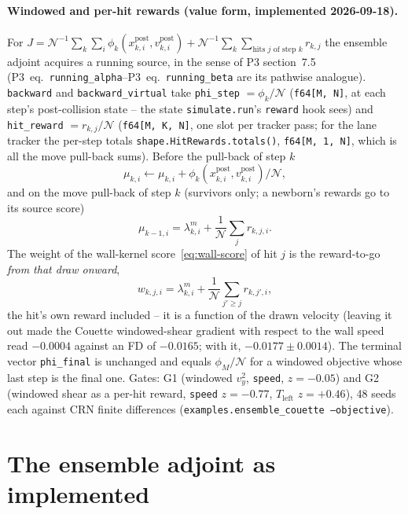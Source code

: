 \documentclass[11pt,a4paper]{article}
\numberwithin{equation}{section}
\newcommand{\code}[1]{\texttt{#1}}
\newcommand{\pth}{\mathrm{post}}
\newcommand{\Nn}{\mathcal{N}}
\newcommand{\pref}[1]{P3~eq.~\code{#1}}
\begin{document}
\paragraph{Windowed and per-hit rewards (value form, implemented 2026-09-18).}
For $J = \Nn^{-1}\sum_{k} \sum_i \phi_k(x^{\pth}_{k,i}, v^{\pth}_{k,i})
 + \Nn^{-1}\sum_k \sum_{\text{hits } j \text{ of step } k} r_{k,j}$
the ensemble adjoint acquires a running source, in the sense of P3 section~7.5
(\pref{running\_alpha}--\pref{running\_beta} are its pathwise analogue).
\code{backward} and \code{backward\_virtual} take \code{phi\_step} $=\phi_k/\Nn$
(\code{f64[M, N]}, at each step's post-collision state -- the state
\code{simulate.run}'s \code{reward} hook sees) and \code{hit\_reward} $=r_{k,j}/\Nn$
(\code{f64[M, K, N]}, one slot per tracker pass; for the lane tracker the per-step
totals \code{shape.HitRewards.totals()}, \code{f64[M, 1, N]}, which is all the move
pull-back sums).  Before the pull-back of step $k$
\begin{equation}
\label{eq:running-source}
\mu_{k,i} \leftarrow \mu_{k,i} + \phi_k(x^{\pth}_{k,i}, v^{\pth}_{k,i})/\Nn ,
\end{equation}
and on the move pull-back of step $k$ (survivors only; a newborn's rewards go to its
source score)
\begin{equation}
\label{eq:hit-source}
\mu_{k-1,i} = \lambda^m_{k,i} + \frac{1}{\Nn}\sum_{j} r_{k,j,i} .
\end{equation}
The weight of the wall-kernel score~\eqref{eq:wall-score} of hit $j$ is the
reward-to-go \emph{from that draw onward},
\begin{equation}
\label{eq:hit-weight}
w_{k,j,i} = \lambda^m_{k,i} + \frac{1}{\Nn}\sum_{j' \ge j} r_{k,j',i},
\end{equation}
the hit's own reward included -- it is a function of the drawn velocity (leaving it
out made the Couette windowed-shear gradient with respect to the wall speed read
$-0.0004$ against an FD of $-0.0165$; with it, $-0.0177 \pm 0.0014$).  The terminal
vector \code{phi\_final} is unchanged and equals $\phi_M/\Nn$ for a windowed objective
whose last step is the final one.  Gates: G1 (windowed $v_y^2$, \code{speed}, $z=-0.05$)
and G2 (windowed shear as a per-hit reward, \code{speed} $z=-0.77$, $T_{\mathrm{left}}$
$z=+0.46$), 48 seeds each against CRN finite differences
(\code{examples.ensemble\_couette --objective}).

\section{The ensemble adjoint as implemented}
\label{sec:adjoint}
\end{document}
